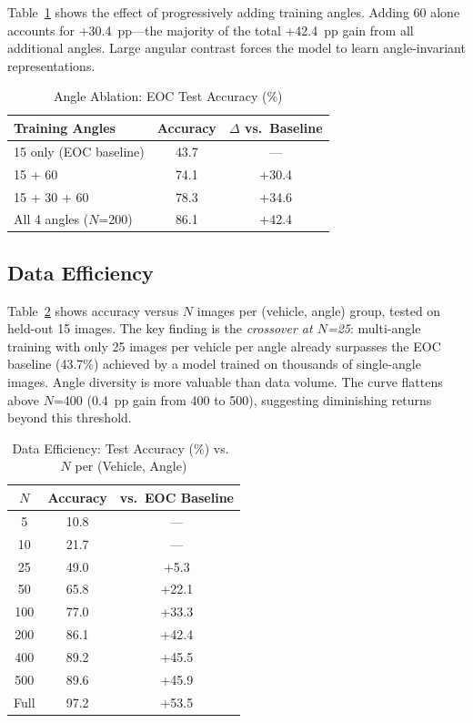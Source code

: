 \documentclass[journal]{IEEEtran}
\begin{document}
Table~\ref{tab:ablation} shows the effect of progressively adding training
angles. Adding 60\textdegree{} alone accounts for +30.4~pp---the majority of
the total +42.4~pp gain from all additional angles. Large angular contrast
forces the model to learn angle-invariant representations.

\begin{table}[t]
  \caption{Angle Ablation: EOC Test Accuracy (\%)}
  \label{tab:ablation}
  \centering
  \begin{tabular}{lcc}
    \toprule
    Training Angles & Accuracy & $\Delta$ vs.\ Baseline \\
    \midrule
    15\textdegree{} only (EOC baseline) & 43.7 & --- \\
    15\textdegree{} + 60\textdegree{} & 74.1 & +30.4 \\
    15\textdegree{} + 30\textdegree{} + 60\textdegree{} & 78.3 & +34.6 \\
    All 4 angles ($N$=200) & 86.1 & +42.4 \\
    \bottomrule
  \end{tabular}
\end{table}

\subsection{Data Efficiency}

Table~\ref{tab:efficiency} shows accuracy versus $N$ images per (vehicle,
angle) group, tested on held-out 15\textdegree{} images. The key finding is
the \textit{crossover at $N$=25}: multi-angle training with only 25 images per
vehicle per angle already surpasses the EOC baseline (43.7\%) achieved by a
model trained on thousands of single-angle images. Angle diversity is more
valuable than data volume. The curve flattens above $N$=400 (0.4~pp gain from
400 to 500), suggesting diminishing returns beyond this threshold.

\begin{table}[t]
  \caption{Data Efficiency: Test Accuracy (\%) vs.\ $N$ per (Vehicle, Angle)}
  \label{tab:efficiency}
  \centering
  \begin{tabular}{ccc}
    \toprule
    $N$ & Accuracy & vs.\ EOC Baseline \\
    \midrule
    5   & 10.8 & --- \\
    10  & 21.7 & --- \\
    25  & 49.0 & +5.3 \\
    50  & 65.8 & +22.1 \\
    100 & 77.0 & +33.3 \\
    200 & 86.1 & +42.4 \\
    400 & 89.2 & +45.5 \\
    500 & 89.6 & +45.9 \\
    Full & 97.2 & +53.5 \\
    \bottomrule
  \end{tabular}
\end{table}
\end{document}
